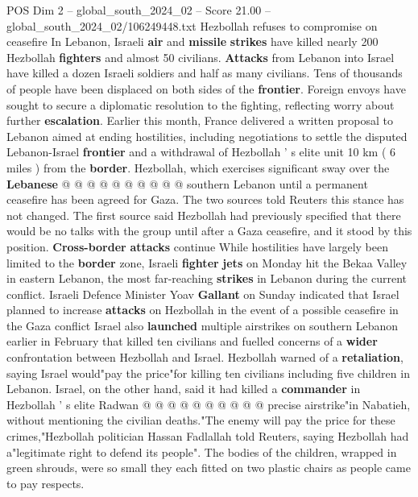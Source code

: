 \begin{textsample}{POS Dim 2 – global\_south\_2024\_02 – Score 21.00 – global\_south\_2024\_02/106249448.txt}
Hezbollah refuses to compromise on ceasefire In Lebanon, Israeli \textbf{air} and \textbf{missile} \textbf{strikes} have killed nearly 200 Hezbollah \textbf{fighters} and almost 50 civilians. \textbf{Attacks} from Lebanon into Israel have killed a dozen Israeli soldiers and half as many civilians.
Tens of thousands of people have been displaced on both sides of the \textbf{frontier}.
Foreign envoys have sought to secure a diplomatic resolution to the fighting, reflecting worry about further \textbf{escalation}.
Earlier this month, France delivered a written proposal to Lebanon aimed at ending hostilities, including negotiations to settle the disputed Lebanon-Israel \textbf{frontier} and a withdrawal of Hezbollah ' s elite unit 10 km ( 6 miles ) from the \textbf{border}.
Hezbollah, which exercises significant sway over the \textbf{Lebanese} @ @ @ @ @ @ @ @ @ @ southern Lebanon until a permanent ceasefire has been agreed for Gaza.
The two sources told Reuters this stance has not changed.
The first source said Hezbollah had previously specified that there would be no talks with the group until after a Gaza ceasefire, and it stood by this position. \textbf{Cross-border} \textbf{attacks} continue While hostilities have largely been limited to the \textbf{border} zone, Israeli \textbf{fighter} \textbf{jets} on Monday hit the Bekaa Valley in eastern Lebanon, the most far-reaching \textbf{strikes} in Lebanon during the current conflict.
Israeli Defence Minister Yoav \textbf{Gallant} on Sunday indicated that Israel planned to increase \textbf{attacks} on Hezbollah in the event of a possible ceasefire in the Gaza conflict Israel also \textbf{launched} multiple airstrikes on southern Lebanon earlier in February that killed ten civilians and fuelled concerns of a \textbf{wider} confrontation between Hezbollah and Israel.
Hezbollah warned of a \textbf{retaliation}, saying Israel would"pay the price"for killing ten civilians including five children in Lebanon.
Israel, on the other hand, said it had killed a \textbf{commander} in Hezbollah ' s elite Radwan @ @ @ @ @ @ @ @ @ @ precise airstrike"in Nabatieh, without mentioning the civilian deaths."The enemy will pay the price for these crimes,"Hezbollah politician Hassan Fadlallah told Reuters, saying Hezbollah had a"legitimate right to defend its people".
The bodies of the children, wrapped in green shrouds, were so small they each fitted on two plastic chairs as people came to pay respects.

\end{textsample}
